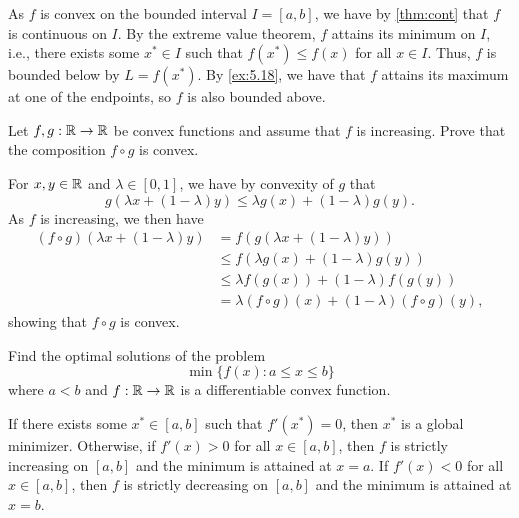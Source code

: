 \begin{solution}
  As $f$ is convex on the bounded interval $I = [a, b]$, we have by \cref{thm:cont} that $f$ is continuous on $I$.
  By the extreme value theorem, $f$ attains its minimum on $I$, i.e., there exists some $x^*\in I$ such that $f(x^*) \leq f(x)$ for all $x \in I$.
  Thus, $f$ is bounded below by $L = f(x^*)$.
  By \cref{ex:5.18}, we have that $f$ attains its maximum at one of the endpoints, so $f$ is also bounded above.
\end{solution}

\begin{exercise}\label{ex:5.20}
  Let $f, g : \mathbb{R} \to \mathbb{R}$ be convex functions and assume that $f$ is increasing.
  Prove that the composition $f \circ g$ is convex.
\end{exercise}

\begin{solution}
  For $x, y \in \mathbb{R}$ and $\lambda \in [0, 1]$, we have by convexity of $g$ that
  \begin{equation}
    g( \lambda x + (1 - \lambda) y )
    \leq
    \lambda g(x) + (1 - \lambda) g(y).
  \end{equation}
  As $f$ is increasing, we then have
  \begin{align*}
    (f \circ g)( \lambda x + (1 - \lambda) y )
    &= f( g( \lambda x + (1 - \lambda) y ) ) \\
    &\leq f( \lambda g(x) + (1 - \lambda) g(y) ) \\
    &\leq \lambda f( g(x) ) + (1 - \lambda) f( g(y) ) \\
    &= \lambda (f \circ g)(x) + (1 - \lambda) (f \circ g)(y),
  \end{align*}
  showing that $f \circ g$ is convex.
\end{solution}

\begin{exercise}
  Find the optimal solutions of the problem
  \begin{equation}
    \min\{ f(x) : a \leq x \leq b \}
  \end{equation}
  where $a < b$ and $f : \mathbb{R} \to \mathbb{R}$ is a differentiable convex function.
\end{exercise}

\begin{solution}
  If there exists some $x^* \in [a, b]$ such that $f'(x^*) = 0$, then $x^*$ is a global minimizer.
  Otherwise, if $f'(x) > 0$ for all $x \in [a, b]$, then $f$ is strictly increasing on $[a, b]$ and the minimum is attained at $x = a$.
  If $f'(x) < 0$ for all $x \in [a, b]$, then $f$ is strictly decreasing on $[a, b]$ and the minimum is attained at $x = b$.
\end{solution}

